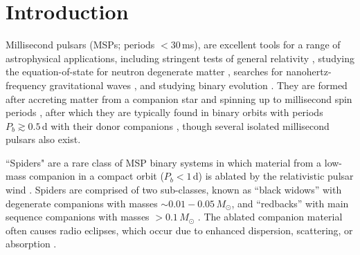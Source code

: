 \documentclass[fleqn,usenatbib]{mnras}
\begin{document}

\section{Introduction}
\label{sec:intro}
Millisecond pulsars (MSPs; periods $<30$\,ms), are excellent tools for a range of astrophysical applications, including stringent tests of general relativity \citep{2021PhRvX..11d1050K}, studying the equation-of-state for neutron degenerate matter \citep{2019ApJ...887L..24M}, searches for nanohertz-frequency gravitational waves \citep{2023RAA....23g5024X,2023ApJ...951L...6R,2023A&A...678A..50E,2023ApJ...951L...8A}, and studying binary evolution \citep{2012ApJ...753L..33B,2015MNRAS.446.2540S,2013ApJ...775...27C}. They are formed after accreting matter from a companion star and spinning up to millisecond spin periods \citep{1982Natur.300..728A}, after which they are typically found in binary orbits with periods $P_b\gtrsim 0.5$\,d with their donor companions \citep{2006csxs.book..623T}, though several isolated millisecond pulsars also exist.

``Spiders" are a rare class of MSP binary systems in which material from a low-mass companion in a compact orbit ($P_b < 1$\,d) is ablated by the relativistic pulsar wind \citep{2013IAUS..291..127R}. Spiders are comprised of two sub-classes, known as ``black widows'' with degenerate companions with masses $\sim 0.01-0.05 \,M_\odot$, and ``redbacks'' with main sequence companions with masses $>0.1\,M_\odot$ \citep{2013IAUS..291..127R}. The ablated companion material often causes radio eclipses, which occur due to enhanced dispersion, scattering, or absorption \citep{1988Natur.333..237F,1996ApJ...465L.119S,2020MNRAS.494.2948P,2021ApJ...922L..13W, 2022MNRAS.513.1794B}. 
\end{document}
